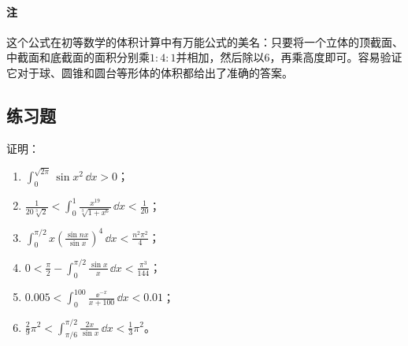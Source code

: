 \paragraph{注} 这个公式在初等数学的体积计算中有万能公式的美名：只要将一个立体的顶截面、中截面和底截面的面积分别乘$1:4:1$并相加，然后除以6，再乘高度即可。容易验证它对于球、圆锥和圆台等形体的体积都给出了准确的答案。

\subsection{练习题}

\begin{xexercise}[1]
证明：
  \begin{enumerate}[label=(\arabic*)]
    \item $\displaystyle \int_0^{\sqrt{2\pi}}\sin x^2\,\dd x>0$；
    \item $\displaystyle \frac1{20\sqrt[3]{2}}<\int_0^1\frac{x^{19}}{\sqrt[3]{1+x^6}}\,\dd x<\frac1{20}$；
    \item $\displaystyle \int_0^{\pi/2}x\left(\frac{\sin nx}{\sin x}\right)^4\,\dd x<\frac{n^2\pi^2}{4}$；
    \item $\displaystyle 0<\frac\pi2-\int_0^{\pi/2}\frac{\sin x}{x}\,\dd x<\frac{\pi^3}{144}$；
    \item $\displaystyle 0.005<\int_0^{100}\frac{\ee^{-x}}{x+100}\,\dd x<0.01$；
    \item $\displaystyle \frac29\pi^2<\int_{\pi/6}^{\pi/2}\frac{2x}{\sin x}\,\dd x<\frac13\pi^2$。
  \end{enumerate}
\end{xexercise}
